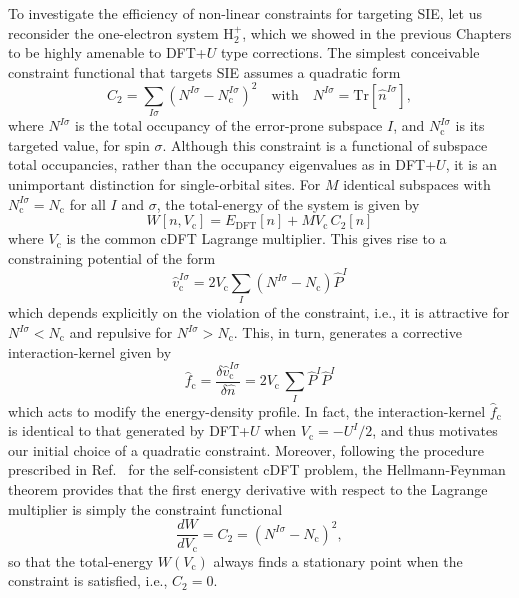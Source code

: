 To investigate the efficiency  
of non-linear constraints for targeting SIE, 
let us reconsider the one-electron system H$_2^+$, 
which we showed in the previous Chapters 
to be highly amenable to DFT+$U$ type corrections.
%
The simplest conceivable constraint functional
that targets SIE assumes a quadratic form
%
\begin{equation}
C_2 =\sum_{I\sigma} ( N^{I\sigma} - N^{I\sigma}_\textrm{c} )^2 
\quad\mbox{with}\quad
N^{I\sigma}  = \textrm{Tr} [ \hat{n}^{I\sigma} ], 
\end{equation}
%
where $N^{I\sigma}$ is the total occupancy of 
the error-prone subspace $I$, 
and $N^{I\sigma}_\textrm{c}$ is its targeted value, 
for spin $\sigma$.
%
Although this constraint is a 
functional of subspace total occupancies, 
rather than the occupancy eigenvalues as in DFT+$U$, 
it is an unimportant distinction for single-orbital sites.
%
For $M$ identical subspaces with  
$N^{I\sigma}_\textrm{c} = N_\textrm{c}$ for all $I$ and $\sigma$, 
the total-energy of the system is given by
%
{
\begin{equation}
W[n,V_\textrm{c}] = E_\textrm{DFT}[n] + M V_\textrm{c}\,C_2[n]
\end{equation}}
where $V_\textrm{c}$ is the common 
cDFT Lagrange multiplier.
%
This gives rise to a constraining potential of the form
%
\begin{equation}
\hat{v}^{I\sigma}_\textrm{c} = 
2 V_\textrm{c} \sum_I ( N^{I\sigma} - N_\textrm{c} ) \hat{P}^{I } 
\end{equation}
%
which depends explicitly 
on the violation of the constraint, i.e., 
it is attractive for $N^{I\sigma}<N_\textrm{c}$ 
and repulsive for $N^{I\sigma}>N_\textrm{c}$.
%
This, in turn, 
generates a corrective 
interaction-kernel given by
%
\begin{equation}
\hat{f}_\textrm{c}=\frac{\delta \hat{v}^{I\sigma}_\textrm{c}}{\delta\hat{n}}= 2 V_\textrm{c}\, \sum_I \hat{P}^{I }  \hat{P}^{I} 
\label{eq:cdft_kernel}
\end{equation}
%
which acts to modify the energy-density profile.
%
In fact, the interaction-kernel $\hat{f}_\textrm{c}$
is identical to that generated by DFT+$U$
when $V_\textrm{c} = - U^I / 2$, 
and thus motivates 
our initial choice of a quadratic constraint.
%
Moreover, 
following the procedure prescribed in 
Ref.~\cite{PhysRevB.94.035159} 
for the self-consistent cDFT problem,
the Hellmann-Feynman theorem 
provides that the first energy derivative 
with respect to the Lagrange multiplier 
is simply the constraint functional 
%
\begin{equation}
\frac{d W}{d V_{\textrm{c}}} = C_2 = (N^{I\sigma}-N_\textrm{c})^2,
\label{eq:energy_deriv1}
\end{equation}
%
so that the total-energy 
$W \left( V_\textrm{c}  \right)$ 
always finds a stationary point 
when the constraint is satisfied, i.e., $C_2 = 0$.
%

